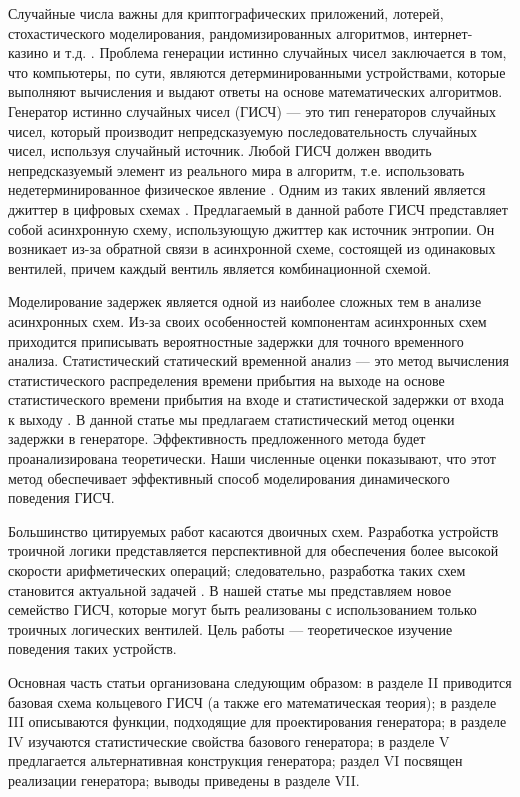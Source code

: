 \documentclass[a4paper,12pt]{article}
\begin{document}
Случайные числа важны для криптографических приложений, лотерей, стохастического моделирования, рандомизированных алгоритмов, интернет-казино и т.д. \cite{asmussen2007, ferguson2010}. Проблема генерации истинно случайных чисел заключается в том, что компьютеры, по сути, являются детерминированными устройствами, которые выполняют вычисления и выдают ответы на основе математических алгоритмов. Генератор истинно случайных чисел (ГИСЧ) --- это тип генераторов случайных чисел, который производит непредсказуемую последовательность случайных чисел, используя случайный источник. Любой ГИСЧ должен вводить непредсказуемый элемент из реального мира в алгоритм, т.е. использовать недетерминированное физическое явление \cite{brede2006,bucho2016,toku2007}. Одним из таких явлений является джиттер в цифровых схемах \cite{horowitz1980,petrie1996,golic2006,sunar2007,kuzn2008,wiec2014,robson2014,amaki2011,guo2015}. Предлагаемый в данной работе ГИСЧ представляет собой асинхронную схему, использующую джиттер как источник энтропии. Он возникает из-за обратной связи в асинхронной схеме, состоящей из одинаковых вентилей, причем каждый вентиль является комбинационной схемой.

Моделирование задержек является одной из наиболее сложных тем в анализе асинхронных схем. Из-за своих особенностей компонентам асинхронных схем приходится приписывать вероятностные задержки для точного временного анализа. Статистический статический временной анализ --- это метод вычисления статистического распределения времени прибытия на выходе на основе статистического времени прибытия на входе и статистической задержки от входа к выходу \cite{weig1994,liu2009,liu2012,yahy2013,xiao2014,islam2016,kim2015}. В данной статье мы предлагаем статистический метод оценки задержки в генераторе. Эффективность предложенного метода будет проанализирована теоретически. Наши численные оценки показывают, что этот метод обеспечивает эффективный способ моделирования динамического поведения ГИСЧ.

Большинство цитируемых работ касаются двоичных схем. Разработка устройств троичной логики представляется перспективной для обеспечения более высокой скорости арифметических операций; следовательно, разработка таких схем становится актуальной задачей \cite{wu1990,gaik2015,lisa2015}. В нашей статье мы представляем новое семейство ГИСЧ, которые могут быть реализованы с использованием только троичных логических вентилей. Цель работы --- теоретическое изучение поведения таких устройств.

Основная часть статьи организована следующим образом: в разделе II приводится базовая схема кольцевого ГИСЧ (а также его математическая теория); в разделе III описываются функции, подходящие для проектирования генератора; в разделе IV изучаются статистические свойства базового генератора; в разделе V предлагается альтернативная конструкция генератора; раздел VI посвящен реализации генератора; выводы приведены в разделе VII.
\end{document}
